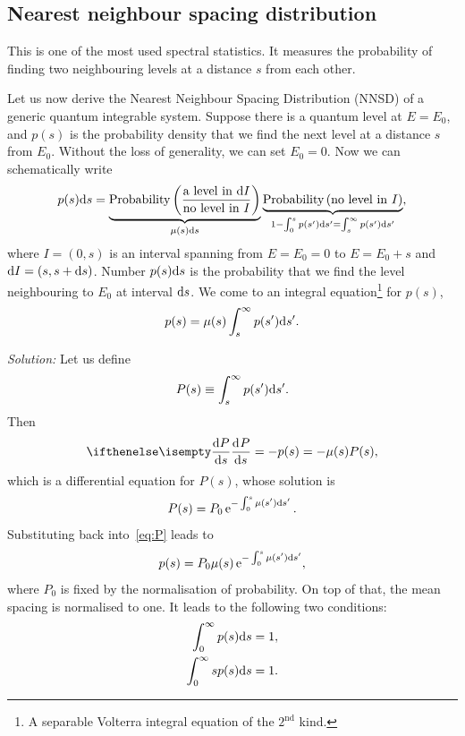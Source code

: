 \documentclass[a4paper,11pt,twoside]{article}
\begin{document}
    \subsection{Nearest neighbour spacing distribution}
        This is one of the most used spectral statistics.
        It measures the probability of finding two neighbouring levels at a distance $s$ from each other.

        Let us now derive the Nearest Neighbour Spacing Distribution (NNSD) of a generic quantum integrable system.
        Suppose there is a quantum level at $E=E_{0}$, and $p(s)$ is the probability density that we find the next level at a distance $s$ from $E_{0}$.  
        Without the loss of generality, we can set $E_{0}=0$.
        Now we can schematically write 
        \begin{equation}
            p(s)\mathrm{d} s
                =\underbrace{\text{Probability}\left(\frac{\text{a level in }\mathrm{d} I}{\text{no level in }I}\right)}_{\mu(s)\mathrm{d} s}
                \underbrace{\text{Probability}\left(\text{no level in }I\right)}_{1-\int_{0}^{s}p(s')\mathrm{d} s'=\int_{s}^{\infty}p(s')\mathrm{d} s'},
        \end{equation}
        where $I=(0,s)$ is an interval spanning from $E=E_{0}=0$ to $E=E_{0}+s$ and $\mathrm{d} I=(s,s+\mathrm{d} s)$.
        Number $p(s)\mathrm{d} s$ is the probability that we find the level neighbouring to $E_{0}$ at interval $\mathrm{d} s$.
        We come to an integral equation\footnote{A separable Volterra integral equation of the $2^{\text{nd}}$ kind.} for $p(s)$,
        \begin{equation}
            p(s)=\mu(s)\int_{s}^{\infty}p(s')\mathrm{d} s'.
        \end{equation}
        
        \emph{Solution:} Let us define
        \begin{equation}
            P(s)\equiv\int_{s}^{\infty}p(s')\mathrm{d} s'.
        \end{equation}
        Then
        \begin{equation}\label{eq:P}
            \derivative{P}{s}=-p(s)=-\mu(s)P(s),
        \end{equation}
        which is a differential equation for $P(s)$, whose solution is
        \begin{equation}
            P(s)=P_{0}\operatorname{e}^{-\int_{0}^{s}\mu(s')\mathrm{d} s'}.
        \end{equation}
        Substituting back into~\eqref{eq:P} leads to
        \begin{equation}\label{eq:pseq}
            p(s)=P_{0}\mu(s)\operatorname{e}^{-\int_{0}^{s}\mu(s')\mathrm{d} s'},
        \end{equation}
        where $P_{0}$ is fixed by the normalisation of probability.
        On top of that, the mean spacing is normalised to one.
        It leads to the following two conditions:
        \begin{align}
            \int_{0}^{\infty}p(s)\mathrm{d} s&=1,\nonumber\\
            \label{eq:psnorm}
            \int_{0}^{\infty}s p(s)\mathrm{d} s&=1.
        \end{align}
         
\end{document}
